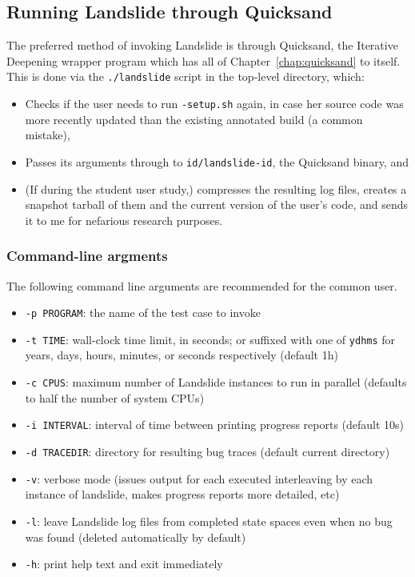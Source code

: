 
\subsection{Running Landslide through Quicksand}
\label{sec:landslide-quicksand-options}

The preferred method of invoking Landslide is through Quicksand, the Iterative Deepening wrapper program which has all of Chapter~\ref{chap:quicksand} to itself.
This is done via the {\tt ./landslide} script in the top-level directory, which:
\begin{itemize}
	\item Checks if the user needs to run {\tt *-setup.sh} again, in case her source code was more recently updated than the existing annotated build (a common mistake),
	\item Passes its arguments through to {\tt id/landslide-id}, the Quicksand binary,
		and
	\item (If during the student user study,) compresses the resulting log files,
		creates a snapshot tarball of them and the current version of the user's code,
		and sends it to me for nefarious research purposes.
\end{itemize}


\subsubsection{Command-line argments}

The following command line arguments are recommended for the common user.

\begin{itemize}
	\item {\tt -p PROGRAM}: the name of the test case to invoke
	\item {\tt -t TIME}: wall-clock time limit, in seconds; or suffixed with one of {\tt ydhms} for years, days, hours, minutes, or seconds respectively (default 1h)
	\item {\tt -c CPUS}: maximum number of Landslide instances to run in parallel (defaults to half the number of system CPUs)
	\item {\tt -i INTERVAL}: interval of time between printing progress reports (default 10s)
	\item {\tt -d TRACEDIR}: directory for resulting bug traces (default current directory)
	\item {\tt -v}: verbose mode (issues output for each executed interleaving by each instance of landslide, makes progress reports more detailed, etc)
	\item {\tt -l}: leave Landslide log files from completed state spaces even when no bug was found (deleted automatically by default)
	\item {\tt -h}: print help text and exit immediately
\end{itemize}

